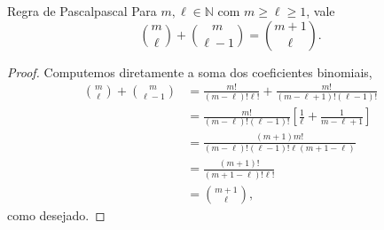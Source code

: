 \begin{lemma}{Regra de Pascal}{pascal}
   Para \(m, \ell \in \mathbb{N}\) com \(m \geq \ell \geq 1\), vale
   \begin{equation*}
       \binom{m}{\ell} + \binom{m}{\ell - 1} = \binom{m + 1}{\ell}.
   \end{equation*}
\end{lemma}
\begin{proof}
    Computemos diretamente a soma dos coeficientes binomiais,
    \begin{align*}
        \binom{m}{\ell} + \binom{m}{\ell - 1} &= \frac{m!}{(m - \ell)!\ell!} + \frac{m!}{(m - \ell + 1)!(\ell - 1)!}\\
                                              &= \frac{m!}{(m - \ell)! (\ell -1)!}\left[\frac{1}{\ell} + \frac{1}{m - \ell + 1}\right]\\
                                              &= \frac{(m+1)m!}{(m - \ell)! (\ell-1)!\ell (m+1-\ell)}\\
                                              &= \frac{(m+1)!}{(m+1-\ell)!\ell!}\\
                                              &= \binom{m+1}{\ell},
    \end{align*}
    como desejado.
\end{proof}

